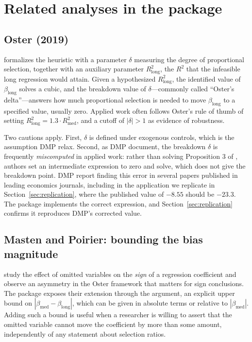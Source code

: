 \documentclass[article]{jss}\usepackage[]{graphicx}\usepackage[]{xcolor}
\newcommand{\blong}{\beta_{\mathrm{long}}}
\newcommand{\bmed}{\beta_{\mathrm{med}}}
\begin{document}
\section{Related analyses in the package}\label{sec:related}

\subsection{Oster (2019)}

\citet{Oster2019} formalizes the \citet{Altonji2005} heuristic with a
parameter $\delta$ measuring the degree of proportional selection, together
with an auxiliary parameter $R^2_{\mathrm{long}}$, the $R^2$ that the
infeasible long regression would attain. Given a hypothesized
$R^2_{\mathrm{long}}$, the identified value of $\blong$ solves a cubic, and
the breakdown value of $\delta$---commonly called ``Oster's
delta''---answers how much proportional selection is needed to move
$\blong$ to a specified value, usually zero. Applied work often follows
Oster's rule of thumb of setting
$R^2_{\mathrm{long}} = 1.3 \cdot R^2_{\mathrm{med}}$, and a cutoff of
$|\delta| > 1$ as evidence of robustness.

Two cautions apply. First, $\delta$ is defined under exogenous controls,
which is the assumption DMP relax. Second, as DMP document, the breakdown
$\delta$ is frequently \emph{miscomputed} in applied work: rather than
solving Proposition 3 of \citet{Oster2019}, authors set an intermediate
expression to zero and solve, which does not give the breakdown point. DMP
report finding this error in several papers published in leading economics
journals, including in the application we replicate in
Section~\ref{sec:replication}, where the published value of $-8.55$ should
be $-23.3$. The package implements the correct expression, and
Section~\ref{sec:replication} confirms it reproduces DMP's corrected value.

\subsection{Masten and Poirier: bounding the bias magnitude}

\citet{Masten2026} study the effect of omitted variables on the
\emph{sign} of a regression coefficient and observe an asymmetry in the
Oster framework that matters for sign conclusions. The package exposes
their extension through the  argument, an explicit upper bound
on $|\bmed - \blong|$, which can be given in absolute terms or relative to
$|\bmed|$. Adding such a bound is useful when a researcher is willing to
assert that the omitted variable cannot move the coefficient by more than
some amount, independently of any statement about selection ratios.
\end{document}
